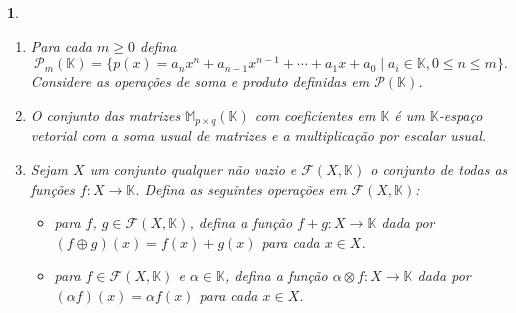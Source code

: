 \documentclass[12pt]{exam}
\newtheorem{exercicio}{}
\newcommand{\cp}[1]{\mathbb{#1}}
\begin{document}
\begin{exercicio}
\begin{enumerate}[label={\alph*})]
    \item Para cada $m \ge 0$ defina
    \[
      \mathcal{P}_m(\cp{K}) = \{ p(x) = a_nx^n + a_{n - 1}x^{n - 1} + \cdots + a_1x + a_0 \mid a_i \in \cp{K}, 0 \le n \le m \}.
    \]
    Considere as opera\c{c}\~oes de soma e produto definidas em $\mathcal{P}(\cp{K})$.

    \item O conjunto das matrizes $\cp{M}_{p \times q}(\cp{K})$ com coeficientes em $\cp{K}$ \'e um $\cp{K}$-espa\c{c}o vetorial com a soma usual de matrizes e a multiplica\c{c}\~ao por escalar usual.

    \item Sejam $X$ um conjunto qualquer n\~ao vazio e $\mathcal{F}(X, \cp{K})$ o conjunto de todas as fun\c{c}\~oes $f : X \to \cp{K}$. Defina as seguintes opera\c{c}\~oes em $\mathcal{F}(X, \cp{K})$:
    \begin{itemize}
      \item  para $f$, $g \in \mathcal{F}(X, \cp{K})$, defina a fun\c{c}\~ao $f + g : X \to \cp{K}$ dada por $(f\oplus g)(x) = f(x) + g(x)$ para cada $x \in X$.
      \item para $f \in \mathcal{F}(X, \cp{K})$ e $\alpha \in \cp{K}$, defina a fun\c{c}\~ao $\alpha \otimes f: X \to \cp{K}$ dada por $(\alpha f)(x) = \alpha f(x)$ para cada $x \in X$.
    \end{itemize}
  \end{enumerate}
\end{exercicio}

\end{document}
